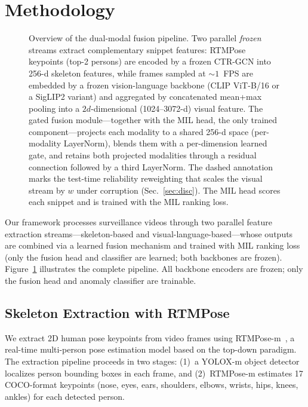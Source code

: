 \documentclass[sigconf]{acmart}
\begin{document}
\section{Methodology}

\begin{figure}[t]
  \centering
  \resizebox{\textwidth}{!}{}
  \caption{Overview of the dual-modal fusion pipeline. Two parallel \emph{frozen} streams extract complementary snippet features: RTMPose keypoints (top-2 persons) are encoded by a frozen CTR-GCN into 256-d skeleton features, while frames sampled at ${\sim}1$~FPS are embedded by a frozen vision-language backbone (CLIP ViT-B/16 or a SigLIP2 variant) and aggregated by concatenated mean+max pooling into a $2d$-dimensional (1024--3072-d) visual feature. The gated fusion module---together with the MIL head, the only trained component---projects each modality to a shared 256-d space (per-modality LayerNorm), blends them with a per-dimension learned gate, and retains both projected modalities through a residual connection followed by a third LayerNorm. The dashed annotation marks the test-time reliability reweighting that scales the visual stream by $w$ under corruption (Sec.~\ref{sec:disc}). The MIL head scores each snippet and is trained with the MIL ranking loss.}
  \label{fig:architecture}
\end{figure}

Our framework processes surveillance videos through two parallel feature extraction streams---skeleton-based and visual-language-based---whose outputs are combined via a learned fusion mechanism and trained with MIL ranking loss (only the fusion head and classifier are learned; both backbones are frozen). Figure~\ref{fig:architecture} illustrates the complete pipeline. All backbone encoders are frozen; only the fusion head and anomaly classifier are trainable.

\subsection{Skeleton Extraction with RTMPose}

We extract 2D human pose keypoints from video frames using RTMPose-m~\cite{jiang2023rtmpose}, a real-time multi-person pose estimation model based on the top-down paradigm. The extraction pipeline proceeds in two stages: (1)~a YOLOX-m object detector localizes person bounding boxes in each frame, and (2)~RTMPose-m estimates 17 COCO-format keypoints (nose, eyes, ears, shoulders, elbows, wrists, hips, knees, ankles) for each detected person.
\end{document}
